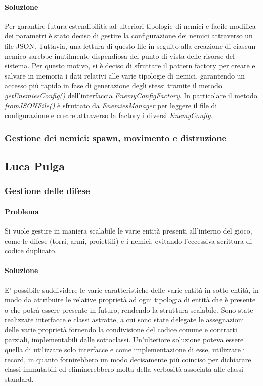 \documentclass[a4paper,12pt]{report}
\begin{document}
\paragraph{Soluzione} Per garantire futura estendibilità ad ulteriori tipologie di nemici e facile modifica dei parametri è stato deciso di gestire la configurazione dei nemici attraverso un file JSON. Tuttavia, una lettura di questo file in seguito alla creazione di ciascun nemico sarebbe inutilmente dispendiosa del punto di vista delle risorse del sistema. Per questo motivo, si è deciso di sfruttare il pattern factory per creare e salvare in memoria i dati relativi alle varie tipologie di nemici, garantendo un accesso più rapido in fase di generazione degli stessi tramite il metodo \textit{getEnemiesConfig()} dell'interfaccia \textit{EnemyConfigFactory}. In particolare il metodo \textit{fromJSONFile()} è sfruttato da \textit{EnemiesManager} per leggere il file di configurazione e creare attraverso la factory i diversi \textit{EnemyConfig}.

\subsubsection{Gestione dei nemici: spawn, movimento e distruzione}



\newpage
\subsection{Luca Pulga}
\subsubsection{Gestione delle difese}
\paragraph{Problema}
Si vuole gestire in maniera scalabile le varie entità presenti all'interno del gioco, come le difese (torri, armi, proiettili) e i nemici, evitando l'eccessiva scrittura di codice duplicato.

\paragraph{Soluzione}
E' possibile suddividere le varie caratteristiche delle varie entità in sotto-entità, in modo da attribuire le relative proprietà ad ogni tipologia di entità che è presente
o che potrà essere presente in futuro, rendendo la struttura scalabile. Sono state realizzate interfacce e classi astratte, a cui sono state delegate le assegnazioni delle varie proprietà fornendo la condivisione del codice comune e contratti parziali, implementabili dalle sottoclassi.
Un'ulteriore soluzione poteva essere quella di utilizzare solo interfacce e come implementazione di esse, utilizzare i record, in quanto fornirebbero un modo decisamente più coinciso per dichiarare classi immutabili ed eliminerebbero molta della verbosità associata alle classi standard.
\end{document}
